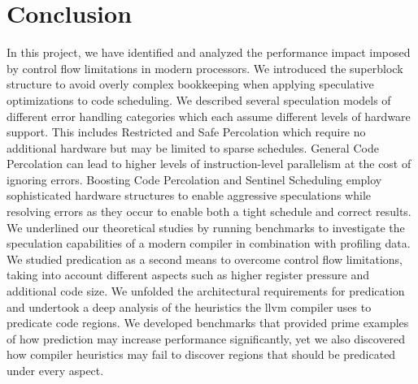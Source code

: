\section{Conclusion}
In this project, we have identified and analyzed the performance impact imposed by control flow limitations in modern processors. We introduced the superblock structure to avoid overly complex bookkeeping when applying speculative optimizations to code scheduling. We described several speculation models of different error handling categories which each assume different levels of hardware support. This includes Restricted and Safe Percolation which require no additional hardware but may be limited to sparse schedules. General Code Percolation can lead to higher levels of instruction-level parallelism at the cost of ignoring errors. Boosting Code Percolation and Sentinel Scheduling employ sophisticated hardware structures to enable aggressive speculations while resolving errors as they occur to enable both a tight schedule and correct results. We underlined our theoretical studies by running benchmarks to investigate the speculation capabilities of a modern compiler in combination with profiling data. We studied predication as a second means to overcome control flow limitations, taking into account different aspects such as higher register pressure and additional code size. We unfolded the architectural requirements for predication and undertook a deep analysis of the heuristics the llvm compiler uses to predicate code regions. We developed benchmarks that provided prime examples of how prediction may increase performance significantly, yet we also discovered how compiler heuristics may fail to discover regions that should be predicated under every aspect. 